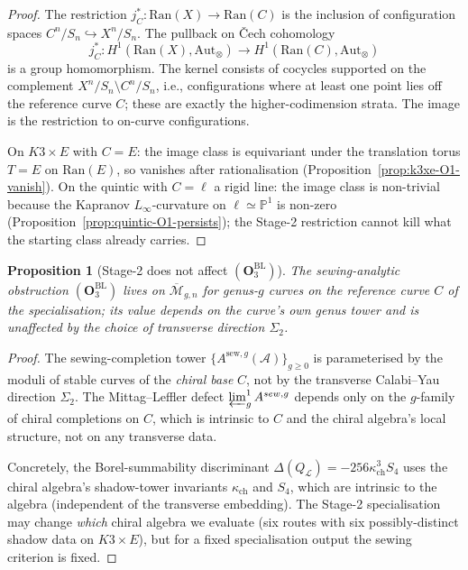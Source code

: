 \documentclass[11pt]{amsart}
\newtheorem{proposition}[theorem]{Proposition}
\newcommand{\kch}{\kappa_{\mathrm{ch}}}
\newcommand{\cA}{\mathcal{A}}
\newcommand{\cL}{\mathcal{L}}
\newcommand{\Ran}{\mathrm{Ran}}
\newcommand{\Mbar}{\overline{\mathcal{M}}}
\newcommand{\bP}{\mathbb{P}}
\newcommand{\Aut}{\mathrm{Aut}}
\begin{document}
\begin{proof}
The restriction $j_C^* : \Ran(X) \to \Ran(C)$ is the inclusion of
configuration spaces $C^n/S_n \hookrightarrow X^n/S_n$. The pullback
on \v{C}ech cohomology
\[
j_C^* : H^1(\Ran(X), \Aut_\otimes) \to H^1(\Ran(C), \Aut_\otimes)
\]
is a group homomorphism. The kernel consists of cocycles supported
on the complement $X^n/S_n \setminus C^n/S_n$, i.e., configurations
where at least one point lies off the reference curve $C$; these
are exactly the higher-codimension strata. The image is the
restriction to on-curve configurations.

On $K3 \times E$ with $C = E$: the image class is equivariant under
the translation torus $T = E$ on $\Ran(E)$, so vanishes after
rationalisation (Proposition~\ref{prop:k3xe-O1-vanish}). On the
quintic with $C = \ell$ a rigid line: the image class is non-trivial
because the Kapranov $L_\infty$-curvature on $\ell \simeq \bP^1$ is
non-zero (Proposition~\ref{prop:quintic-O1-persists}); the
Stage-2 restriction cannot kill what the starting class already
carries.
\end{proof}

\begin{proposition}[Stage-2 does not affect
$(\mathbf{O}_3^{\mathrm{BL}})$]
\label{prop:stage-two-O3-intrinsic}
The sewing-analytic obstruction $(\mathbf{O}_3^{\mathrm{BL}})$ lives
on $\Mbar_{g, n}$ for genus-$g$ curves on the reference curve $C$ of
the specialisation; its value depends on the curve's own genus
tower and is unaffected by the choice of transverse direction
$\Sigma_2$.
\end{proposition}

\begin{proof}
The sewing-completion tower $\{A^{\mathrm{sew}, g}(\cA)\}_{g \geq 0}$
is parameterised by the moduli of stable curves of the \emph{chiral
base} $C$, not by the transverse Calabi--Yau direction $\Sigma_2$.
The Mittag--Leffler defect
$\varprojlim^1_g A^{\mathrm{sew}, g}$ depends only on the $g$-family
of chiral completions on $C$, which is intrinsic to $C$ and the
chiral algebra's local structure, not on any transverse data.

Concretely, the Borel-summability discriminant
$\Delta(Q_\cL) = -256 \kch^3 S_4$ uses the chiral algebra's
shadow-tower invariants $\kch$ and $S_4$, which are intrinsic
to the algebra (independent of the transverse embedding). The
Stage-2 specialisation may change \emph{which} chiral algebra we
evaluate (six routes with six possibly-distinct shadow data on
$K3 \times E$), but for a fixed specialisation output the sewing
criterion is fixed.
\end{proof}
\end{document}
